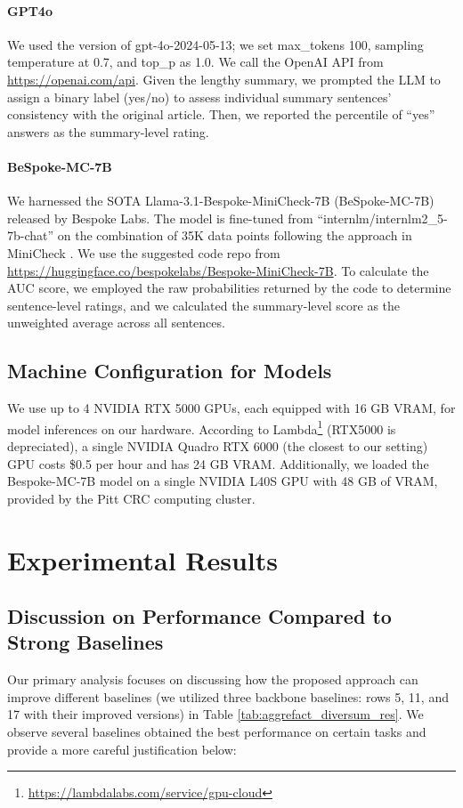 \paragraph{GPT4o}
 We used the version of gpt-4o-2024-05-13; we set max\_tokens 100, sampling temperature at 0.7, and  top\_p as 1.0. We call the OpenAI API from \url{https://openai.com/api}. Given the lengthy summary, we prompted the LLM to assign a binary label (yes/no) to assess individual summary sentences' consistency with the original article. Then, we reported the percentile of ``yes'' answers as the summary-level rating. 

 \paragraph{BeSpoke-MC-7B}
 We harnessed the SOTA Llama-3.1-Bespoke-MiniCheck-7B (BeSpoke-MC-7B) released by Bespoke Labs. The model is fine-tuned from ``internlm/internlm2\_5-7b-chat'' \cite{cai2024internlm2} on the combination of 35K data points following the approach in MiniCheck \cite{tang2024minicheck}. We use the suggested code repo from \url{https://huggingface.co/bespokelabs/Bespoke-MiniCheck-7B}. To calculate the AUC score, we employed the raw probabilities returned by the code to determine sentence-level ratings, and we calculated the summary-level score as the unweighted average across all sentences.



\subsection{Machine Configuration for Models}\label{appendix:machine_config}
We use up to 4 NVIDIA RTX 5000 GPUs, each equipped with 16 GB VRAM,  for model inferences on our hardware. According to Lambda\footnote{\url{https://lambdalabs.com/service/gpu-cloud}} (RTX5000 is depreciated), a single NVIDIA Quadro RTX 6000 (the closest to our setting) GPU costs \$0.5 per hour and has 24 GB VRAM. Additionally, we loaded the Bespoke-MC-7B model on a single NVIDIA L40S GPU with 48 GB of VRAM, provided by the Pitt CRC computing cluster.

\section{Experimental Results}
\subsection{Discussion on Performance Compared to Strong Baselines}\label{appendix:more_discussion}
Our primary analysis focuses on discussing how the proposed approach can improve different baselines (we utilized three backbone baselines: rows 5, 11, and 17 with their improved versions) in Table \ref{tab:aggrefact_diversum_res}. We observe several baselines obtained the best performance on certain tasks and provide a more careful justification below: 

